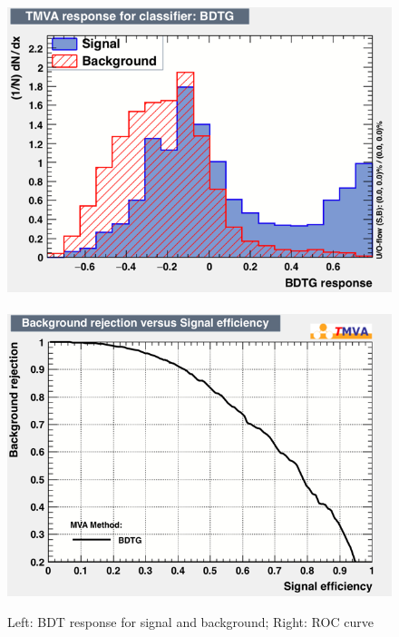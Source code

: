 \begin{figure}[h!]
	\includegraphics[scale=0.40]{Plots/BDT_Performance/Trial2/dataset/plots/mva_BDTG.png}%
	~
	\includegraphics[scale=0.40]{Plots/BDT_Performance/Trial2/dataset/plots/rejBvsS.png}
	\caption{Left: BDT response for signal and background; Right: ROC curve}
\end{figure}

